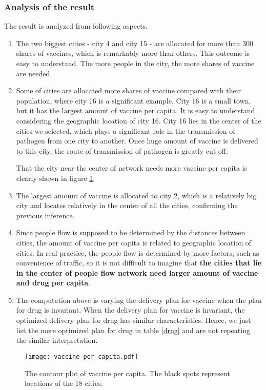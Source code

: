 \subsubsection{Analysis of the result}
The result is analyzed from following aspects.
\begin{enumerate}
\item The two biggest cities - city 4 and city 15 - are allocated for more than 300 shares of vaccines, which is remarkably more than others. This outcome is easy to understand. The more people in the city, the more shares of vaccine are needed.
\item Some of cities are allocated more shares of vaccine compared with their population, where city 16 is a significant example. City 16 is a small town, but it has the largest amount of vaccine per capita. It is easy to understand considering the geographic location of city 16. City 16 lies in the center of the cities we selected, which plays a significant role in the transmission of pathogen from one city to another. Once huge amount of vaccine is delivered to this city, the route of transmission of pathogen is greatly cut off.

That the city near the center of network needs more vaccine per capita is clearly shown in figure \ref{vaccine_per_capita.pdf}.
\item The largest amount of vaccine is allocated to city 2, which is a relatively big city and locates relatively in the center of all the cities, confirming the previous inference.
\item Since people flow is supposed to be determined by the distances between cities, the amount of vaccine per capita is related to geographic location of cities. In real practice, the people flow is determined by more factors, such as convenience of traffic, so it is not difficult to imagine that \textbf{the cities that lie in the center of people flow network need larger amount of vaccine and drug per capita}.
\item The computation above is varying the delivery plan for vaccine when the plan for drug is invariant. When the delivery plan for vaccine is invariant, the optimized delivery plan for drug has similar characteristics. Hence, we just list the mere optimized plan for drug in table \ref{drug} and are not repeating the similar interpretation.
\end{enumerate}

\begin{figure}
\centering
\texttt{[image: vaccine\_per\_capita.pdf]}
\caption{The contour plot of vaccine per capita. The black spots represent locations of the 18 cities.}
\label{vaccine_per_capita.pdf}
\end{figure}

